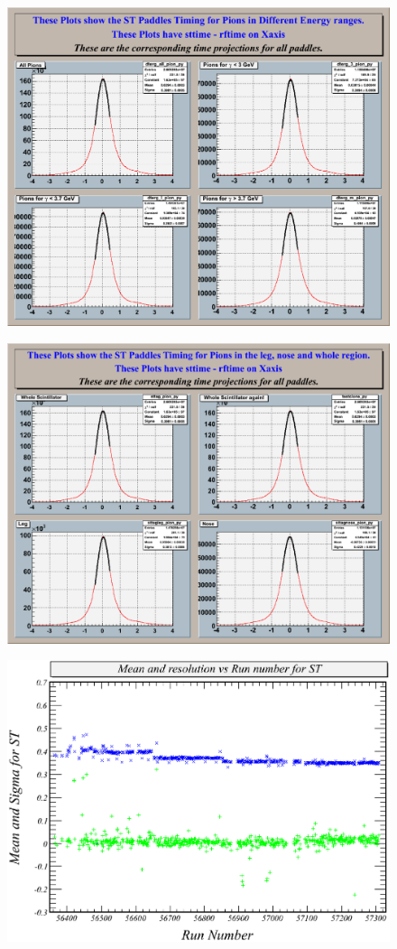\begin{figure}[htbp]\begin{center}
\includegraphics[width=0.6\columnwidth]{figures/calib/st/Sterg_pion.eps}
\caption[]{\label{fig:calib.st.timepion.ebeam}}
\end{center}\end{figure}

\begin{figure}[htbp]\begin{center}
\includegraphics[width=0.6\columnwidth]{figures/calib/st/Timing_pad_3.eps}
\caption[]{\label{fig:calib.st.timepion.region}}
\end{center}\end{figure}

\begin{figure}[htbp]\begin{center}
\includegraphics[width=0.65\columnwidth]{figures/calib/st/STmeanandres_v5.eps}
\caption[]{\label{fig:calib.st.runbyrun}}
\end{center}\end{figure}

